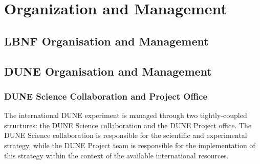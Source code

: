 
\chapter{Organization and Management}
\label{v1ch:org-mgmt}

%
%
%
%
%
%
%
%

\section{LBNF Organisation and Management}

\section{DUNE Organisation and Management}

\subsection{DUNE Science Collaboration and Project Office}
The international DUNE experiment is managed through two tightly-coupled structures: the DUNE Science collaboration and the DUNE Project office.  The DUNE Science collaboration is responsible for the scientific and experimental strategy, while the DUNE Project team is responsible for the implementation of this strategy within the context of the available international resources.


